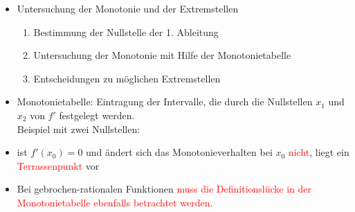 \begin{itemize}
\begin{itemize}
 \end{itemize}
 \item Untersuchung der Monotonie und der Extremstellen\\
 \begin{enumerate}
     \item Bestimmung der Nullstelle der 1. Ableitung\\
     \item Untersuchung der Monotonie mit Hilfe der Monotonietabelle\\
     \item Entscheidungen zu möglichen Extremstellen
 \end{enumerate}
 \item Monotonietabelle: Eintragung der Intervalle, die durch die Nullstellen $x_1$ und $x_2$ von $f'$ festgelegt werden.\\
\mynote Beispiel mit zwei Nullstellen:\\
\item ist $f'(x_0)=0$ und ändert sich das Monotonieverhalten bei $x_0$ \textcolor{red}{nicht}, liegt ein \textcolor{red}{Terrassenpunkt} vor 
\item Bei gebrochen-rationalen Funktionen \textcolor{red} {muss die Definitionslücke in der Monotonietabelle ebenfalls betrachtet werden}.
 \end{itemize}
